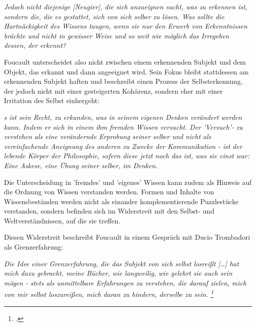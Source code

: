 \begin{myenv}
  \textit{Jedoch \glqq [...] nicht diejenige [Neugier], die sich anzueignen
  sucht, was zu erkennen ist, sondern die, die es gestattet, sich von sich
selber zu lösen. Was sollte die Hartnäckigkeit des Wissens taugen, wenn sie nur
den Erwerb von Erkenntnissen brächte und nicht in gewisser Weise und so weit
wie möglich das Irregehen dessen, der erkennt?\grqq} \footnotemark
{}
\end{myenv}

Foucault unterscheidet also nicht zwischen einem erkennenden Subjekt und dem Objekt, das erkannt und dann angeeignet wird. Sein Fokus bleibt stattdessen am erkennenden Subjekt haften und beschreibt einen Prozess der Selbsterkennung, der jedoch nicht mit einer gesteigerten Kohärenz, sondern eher mit einer Irritation des Selbst einhergeht: 

\begin{myenv}
  \textit{ 
    \glqq [E]s ist sein Recht, zu erkunden, was in seinem eigenen Denken verändert
    werden kann. Indem er sich in einem ihm fremden Wissen versucht. Der
    'Versuch'- zu verstehen als eine verändernde Erprobung seiner selber und 
    nicht als vereinfachende Aneignung des anderen zu Zwecke der Kommunikation
    - ist der lebende Körper der Philosophie, sofern diese jetzt noch das ist,
    was sie einst war: Eine Askese, eine Übung seiner selber, im Denken. \grqq
  } \footnotemark
{}

\end{myenv}

Die Unterscheidung in 'fremdes' und 'eigenes' 
Wissen kann zudem als Hinweis auf die Ordnung von Wissen verstanden werden. Formen und Inhalte von Wissensbeständen werden nicht als einander komplementierende Puzzlestücke verstanden, sondern befinden sich im Widerstreit mit den Selbst- und Weltverständnissen, auf die sie treffen.

Diesen Widerstreit beschreibt Foucault in einem Gespräch mit Ducio Trombadori als Grenzerfahrung:

\begin{myenv}
  \textit{\glqq Die Idee einer Grenzerfahrung, die das Subjekt von sich selbst
  losreißt […] hat mich dazu gebracht, meine Bücher, wie langweilig, wie
gelehrt sie auch sein mögen - stets als unmittelbare Erfahrungen zu verstehen,
die darauf zielen, mich von mir selbst loszureißen, mich daran zu hindern,
derselbe zu sein. \footnotemark \footcitetext{foucinterview} \grqq } 
\end{myenv} 

